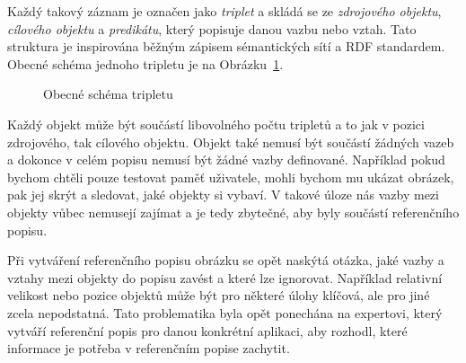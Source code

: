 Každý takový záznam je označen jako \emph{triplet} a skládá se ze \emph{zdrojového objektu},
\emph{cílového objektu} a \emph{predikátu}, který popisuje danou vazbu nebo vztah.
Tato struktura je inspirována běžným zápisem sémantických sítí a RDF standardem.
Obecné schéma jednoho tripletu je na Obrázku~\ref{fig:schema_tripletu}.

\begin{figure}[ht!]
	\centering
	\caption{Obecné schéma tripletu}\label{fig:schema_tripletu}
\end{figure}

Každý objekt může být součástí libovolného počtu tripletů a to jak v pozici zdrojového, tak cílového objektu.
Objekt také nemusí být součástí žádných vazeb a dokonce v celém popisu nemusí být žádné vazby definované.
Například pokud bychom chtěli pouze testovat paměť uživatele, mohli bychom mu ukázat obrázek, pak jej skrýt a sledovat, jaké objekty si vybaví.
V takové úloze nás vazby mezi objekty vůbec nemusejí zajímat a je tedy zbytečné, aby byly součástí referenčního popisu.

Při vytváření referenčního popisu obrázku se opět naskýtá otázka, jaké vazby a vztahy mezi objekty do popisu zavést a které lze ignorovat.
Například relativní velikost nebo pozice objektů může být pro některé úlohy klíčová, ale pro jiné zcela nepodstatná.
Tato problematika byla opět ponechána na expertovi, který vytváří referenční popis pro danou konkrétní aplikaci,
aby rozhodl, které informace je potřeba v referenčním popise zachytit.

